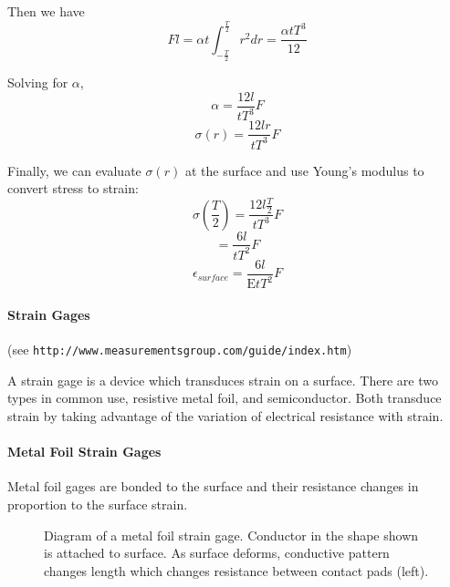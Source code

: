 Then we have
\[
Fl = \alpha t \int^{\frac{T}{2}}_{-\frac{T}{2}} r^2 dr =
\frac{\alpha t T^3}{12}
\]


Solving for $\alpha$,
\[
\alpha = \frac{12l}{tT^3}F
\]
\[
\sigma(r)=\frac{12lr}{tT^3}F
\]

Finally, we can evaluate $\sigma(r)$ at the surface
and use Young's modulus to convert stress to strain:
\[
\sigma(\frac{T}{2}) = \frac{12l\frac{T}{2}}{tT^3}F
\]
\[
= \frac{6l}{tT^2}F
\]
\[
\epsilon_{surface} = \frac{6l}{\mathrm{E}tT^2}F
\]


\paragraph{Strain Gages}

(see {\tt http://www.measurementsgroup.com/guide/index.htm})

A strain gage is a device which transduces strain on a surface.
There are two types in common use, resistive metal foil, and semiconductor.
Both transduce strain by taking advantage of the variation of electrical
resistance with strain.

\paragraph{Metal Foil Strain Gages}

Metal foil gages are bonded to the surface and their resistance
changes in proportion to the surface strain.

\begin{figure}[ht]	%
\begin{center}
\caption{ Diagram of a metal foil strain gage.  Conductor in the	%
 shape shown is attached to surface.   As surface deforms, conductive	%
 pattern changes length which changes resistance between contact pads (left).}	%
\end{center}
\end{figure}	%


